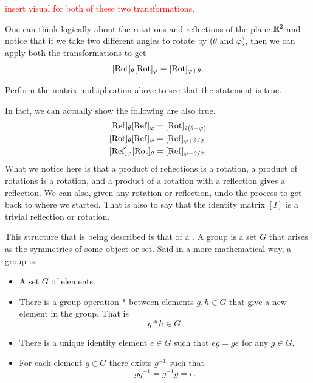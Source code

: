             \textcolor{red}{insert visual for both of these two transformations.}
            
            One can think logically about the rotations and reflections of the plane $\mathbb{R}^2$ and notice that if we take two different angles to rotate by ($\theta$ and $\varphi$), then we can apply both the transformations to get
            \[
            [\mathrm{Rot}]_\theta [\mathrm{Rot}]_\varphi = [\mathrm{Rot}]_{\varphi + \theta}.
            \]
            
            \begin{exercise}
                Perform the matrix multiplication above to see that the statement is true.
            \end{exercise}
            
            \noindent In fact, we can actually show the following are also true.
            \begin{align*}
                \REF_\theta \REF_\varphi &= \Rot_{2(\theta-\varphi)}\\
                \Rot_\theta \REF_\varphi &= \REF_{\varphi + \theta/2}\\
                \REF_\varphi \Rot_\theta &= \REF_{\varphi - \theta/2}.
            \end{align*}
            What we notice here is that a product of reflections is a rotation, a product of rotations is a rotation, and a product of a rotation with a reflection gives a reflection.  We can also, given any rotation or reflection, undo the process to get back to where we started.  That is also to say that the identity matrix $[I]$ is a trivial reflection or rotation.  
            
            This structure that is being described is that of a .  A group is a set $G$ that arises as the symmetries of some object or set.  Said in a more mathematical way, a group is:
            \begin{itemize}
                \item A set $G$ of elements.
                \item There is a group operation $\ast$ between elements $g,h\in G$ that give a new element in the group. That is
                \[
                g\ast h \in G.
                \]
                \item There is a unique identity element $e\in G$ such that $eg=ge$ for any $g\in G$.
                \item For each element $g\in G$ there exists $g^{-1}$ such that
                \[
                gg^{-1} = g^{-1}g=e.
                \]
            \end{itemize}
            
